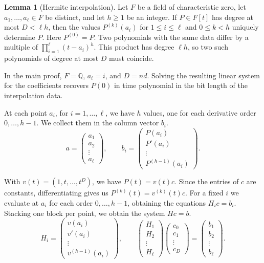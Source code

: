\documentclass{article}
\theoremstyle{definition}
\newtheorem{lemma}[theorem]{Lemma}
\begin{document}
\begin{lemma}[Hermite interpolation]\label{lem:hermite}
Let \(F\) be a field of characteristic zero, let \(a_1,\ldots,a_\ell\in F\)
be distinct, and let \(h\ge 1\) be an integer. If \(P\in F[t]\) has degree
at most \(D<\ell h\), then the values \(P^{(k)}(a_i)\) for
\(1\le i\le\ell\) and \(0\le k<h\) uniquely determine \(P\).
Here \(P^{(0)}=P\). Two polynomials with the same data differ by a multiple
of \(\prod_{i=1}^{\ell}(t-a_i)^h\). This product has degree \(\ell h\), so
two such polynomials of degree at most \(D\) must coincide.

In the main proof, \(F=\mathbb Q\), \(a_i=i\), and \(D=nd\).
Solving the resulting linear system for the coefficients recovers \(P(0)\)
in time polynomial in the bit length of the interpolation data.
\end{lemma}

At each point \(a_i\), for \(i=1,\ldots,\ell\), we have \(h\)
values, one for each derivative order \(0,\ldots,h-1\). We collect
them in the column vector \(b_i\).
\[
    a=\begin{pmatrix}a_1\\a_2\\\vdots\\a_\ell\end{pmatrix},\qquad
    b_i=\begin{pmatrix}
        P(a_i)\\P'(a_i)\\\vdots\\P^{(h-1)}(a_i)
    \end{pmatrix}.
\]

With \(v(t)=(1,t,\ldots,t^D)\), we have \(P(t)=v(t)c\).
Since the entries of \(c\) are constants, differentiating gives us
\(P^{(k)}(t)=v^{(k)}(t)c\). For a fixed \(i\)
we evaluate at \(a_i\) for each order \(0,\ldots,h-1\), obtaining
the equations \(H_i c=b_i\). Stacking one block per point, we obtain
the system \(Hc=b\).
\[
    H_i=\begin{pmatrix}
        v(a_i)\\v'(a_i)\\\vdots\\v^{(h-1)}(a_i)
    \end{pmatrix},\qquad
    \begin{pmatrix}H_1\\H_2\\\vdots\\H_\ell\end{pmatrix}
    \begin{pmatrix}c_0\\c_1\\\vdots\\c_D\end{pmatrix}
    =
    \begin{pmatrix}b_1\\b_2\\\vdots\\b_\ell\end{pmatrix}.
\]
\end{document}
